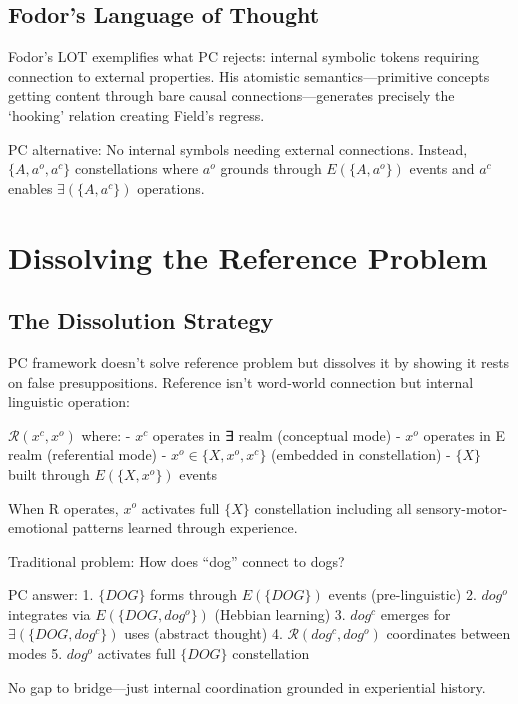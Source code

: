 \documentclass[12pt]{article}
\begin{document}
\subsection{Fodor's Language of Thought}\label{fodors-language-of-thought}

Fodor's LOT exemplifies what PC rejects: internal symbolic tokens requiring connection to external properties. His atomistic semantics---primitive concepts getting content through bare causal connections---generates precisely the `hooking' relation creating Field's regress.

PC alternative: No internal symbols needing external connections. Instead, \(\{A, a^o, a^c\}\) constellations where \(a^o\) grounds through \(E(\{A, a^o\})\) events and \(a^c\) enables \(\exists(\{A, a^c\})\) operations.

\section{Dissolving the Reference Problem}\label{dissolving-the-reference-problem}

\subsection{The Dissolution Strategy}\label{the-dissolution-strategy}

PC framework doesn't solve reference problem but dissolves it by showing it rests on false presuppositions. Reference isn't word-world connection but internal linguistic operation:

\textbf{\(\mathcal{R}(x^c, x^o)\)} where: - \(x^c\) operates in ∃ realm (conceptual mode) - \(x^o\) operates in E realm (referential mode) - \(x^o \in \{X, x^o, x^c\}\) (embedded in constellation) - \(\{X\}\) built through \(E(\{X, x^o\})\) events

When R operates, \(x^o\) activates full \(\{X\}\) constellation including all sensory-motor-emotional patterns learned through experience.

Traditional problem: How does ``dog'' connect to dogs?

PC answer: 1. \(\{DOG\}\) forms through \(E(\{DOG\})\) events (pre-linguistic) 2. \(dog^o\) integrates via \(E(\{DOG, dog^o\})\) (Hebbian learning) 3. \(dog^c\) emerges for \(\exists(\{DOG, dog^c\})\) uses (abstract thought) 4. \(\mathcal{R}(dog^c, dog^o)\) coordinates between modes 5. \(dog^o\) activates full \(\{DOG\}\) constellation

No gap to bridge---just internal coordination grounded in experiential history.
\end{document}
